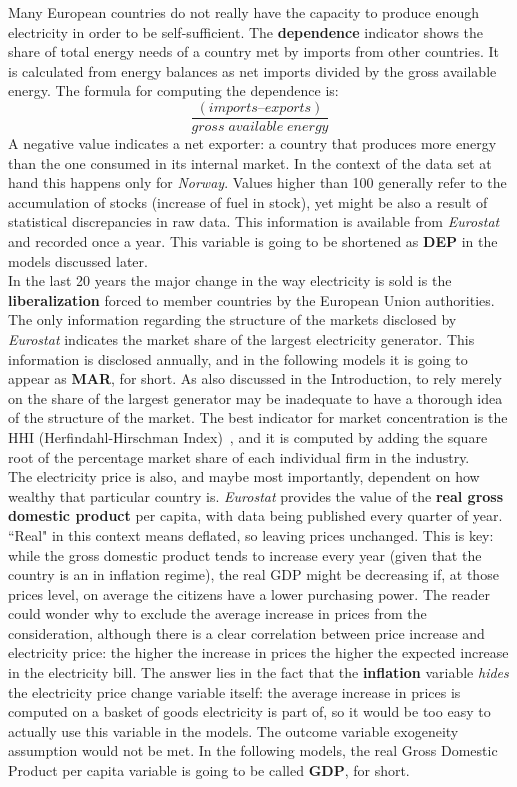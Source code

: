 \documentclass[a4paper,12pt]{book}
\begin{document}
Many European countries do not really have the capacity to produce enough electricity in order to be self-sufficient. The \textbf{dependence} indicator shows the share of total energy needs of a country met by imports from other countries. It is calculated from energy balances as net imports divided by the gross available energy. The formula for computing the dependence is: $$\frac{(imports – exports)}{gross\;available\;energy}$$ A negative value indicates a net exporter: a country that produces more energy than the one consumed in its internal market. In the context of the data set at hand this happens only for \textit{Norway}. Values higher than 100 generally refer to the accumulation of stocks (increase of fuel in stock), yet might be also a result of statistical discrepancies in raw data. This information is available from \textit{Eurostat} and recorded once a year. This variable is going to be shortened as \textbf{DEP} in the models discussed later.\\

In the last 20 years the major change in the way electricity is sold is the \textbf{liberalization} forced to member countries by the European Union authorities. The only information regarding the structure of the markets disclosed by \textit{Eurostat} indicates the market share of the largest electricity generator. This information is disclosed annually, and in the following models it is going to appear as \textbf{MAR}, for short. As also discussed in the Introduction, to rely merely on the share of the largest generator may be inadequate to have a thorough idea of the structure of the market. The best indicator for market concentration is the HHI (Herfindahl-Hirschman Index)~\cite{viscusi2018economics}, and it is computed by adding the square root of the percentage market share of each individual firm in the industry.\\

The electricity price is also, and maybe most importantly, dependent on how wealthy that particular country is. \textit{Eurostat} provides the value of the \textbf{real gross domestic product} per capita, with data being published every quarter of year. ``Real" in this context means deflated, so leaving prices unchanged. This is key: while the gross domestic product tends to increase every year (given that the country is an in inflation regime), the real GDP might be decreasing if, at those prices level, on average the citizens have a lower purchasing power. The reader could wonder why to exclude the average increase in prices from the consideration, although there is a clear correlation between price increase and electricity price: the higher the increase in prices the higher the expected increase in the electricity bill. The answer lies in the fact that the \textbf{inflation} variable \textit{hides} the electricity price change variable itself: the average increase in prices is computed on a basket of goods electricity is part of, so it would be too easy to actually use this variable in the models. The outcome variable exogeneity assumption would not be met. In the following models, the real Gross Domestic Product per capita variable is going to be called \textbf{GDP}, for short.
\end{document}
